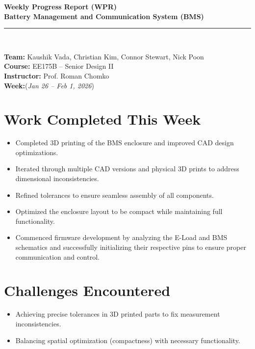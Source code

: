 \documentclass[12pt]{article}
\begin{document}
\begin{center}
    {\Large \textbf{Weekly Progress Report (WPR)}} \\[6pt]
    {\large \textbf{Battery Management and Communication System (BMS)}} \\[2pt]
    \rule{0.8\textwidth}{0.5pt} \\[6pt]
\end{center}

\noindent
\textbf{Team:} Kaushik Vada, Christian Kim, Connor Stewart, Nick Poon \\[3pt]
\textbf{Course:} EE175B – Senior Design II \\
\textbf{Instructor:} Prof. Roman Chomko \\
\textbf{Week:}(\textit{Jan 26 – Feb 1, 2026}) \\[8pt]

\vspace{1em}

\section{Work Completed This Week}
\begin{itemize}[leftmargin=1cm]
    \item Completed 3D printing of the BMS enclosure and improved CAD design optimizations.
    \item Iterated through multiple CAD versions and physical 3D prints to address dimensional inconsistencies.
    \item Refined tolerances to ensure seamless assembly of all components.
    \item Optimized the enclosure layout to be compact while maintaining full functionality.
    \item Commenced firmware development by analyzing the E-Load and BMS schematics and successfully initializing their respective pins to ensure proper communication and control.
\end{itemize}

\vspace{1em}

\section{Challenges Encountered}
\begin{itemize}[leftmargin=1cm]
    \item Achieving precise tolerances in 3D printed parts to fix measurement inconsistencies.
    \item Balancing spatial optimization (compactness) with necessary functionality.
\end{itemize}
\end{document}
